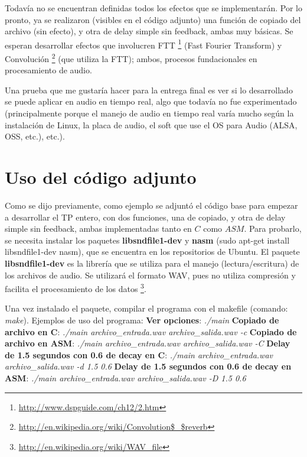 \documentclass[a4paper,spanish,12pt]{article}
\begin{document}
\indent Todavía no se encuentran definidas todos los efectos que se implementarán. Por lo pronto, ya se realizaron (visibles en el código adjunto) una función de copiado del archivo (sin efecto), y otra de delay simple sin feedback, ambas muy básicas. Se esperan desarrollar efectos que involucren FTT \footnote{\url{http://www.dspguide.com/ch12/2.htm}} (Fast Fourier Transform) y Convolución \footnote{\url{http://en.wikipedia.org/wiki/Convolution$_$reverb}} (que utiliza la FTT); ambos, procesos fundacionales en procesamiento de audio.

\indent Una prueba que me gustaría hacer para la entrega final es ver si lo desarrollado se puede aplicar en audio en tiempo real, algo que todavía no fue experimentado (principalmente porque el manejo de audio en tiempo real varía mucho según la instalación de Linux, la placa de audio, el soft que use el OS para Audio (ALSA, OSS, etc.), etc.).

\section{Uso del código adjunto}
\indent Como se dijo previamente, como ejemplo se adjuntó el código base para empezar a desarrollar el TP entero, con dos funciones, una de copiado, y otra de delay simple sin feedback, ambas implementadas tanto en $C$ como $ASM$. Para probarlo, se necesita instalar los paquetes \textbf{libsndfile1-dev} y \textbf{nasm} (sudo apt-get install libsndfile1-dev nasm), que se encuentra en los repositorios de Ubuntu. El paquete \textbf{libsndfile1-dev} es la librería que se utiliza para el manejo (lectura/escritura) de los archivos de audio. Se utilizará el formato WAV, pues no utiliza compresión y facilita el procesamiento de los datos \footnote{\url{http://en.wikipedia.org/wiki/WAV_file}}.
 
\indent Una vez instalado el paquete, compilar el programa con el makefile (comando: \textit{make}). Ejemplos de uso del programa: \newline \newline
\textbf{Ver opciones}: \textit{./main} \newline
\textbf{Copiado de archivo en C}: \textit{./main archivo\_entrada.wav archivo\_salida.wav -c} \newline
\textbf{Copiado de archivo en ASM}: \textit{./main archivo\_entrada.wav archivo\_salida.wav -C} \newline
\textbf{Delay de 1.5 segundos con 0.6 de decay en C}: \textit{./main archivo\_entrada.wav archivo\_salida.wav -d 1.5 0.6} \newline
\textbf{Delay de 1.5 segundos con 0.6 de decay en ASM}: \textit{./main archivo\_entrada.wav archivo\_salida.wav -D 1.5 0.6} \newline\newline
\end{document}
